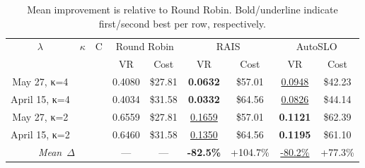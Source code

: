 \documentclass{article}
\begin{document}
\begin{table}[t]
\centering
\footnotesize
\setlength{\tabcolsep}{2.5pt}
\caption{Mean improvement is relative to Round Robin. Bold/underline indicate first/second best per row, respectively.}\label{tab:todo}
\begin{tabular}{c c c || c c | c c | c c}
\toprule
$\lambda$ & $\kappa$ & C & \multicolumn{2}{c|}{Round Robin} & \multicolumn{2}{c|}{RAIS} & \multicolumn{2}{c}{AutoSLO} \\
 &  &  & VR & Cost & VR & Cost & VR & Cost \\
\hline
May 27, κ=4 &  &  & 0.4080 & \$27.81 & \textbf{0.0632} & \$57.01 & \underline{0.0948} & \$42.23 \\
April 15, κ=4 &  &  & 0.4034 & \$31.58 & \textbf{0.0332} & \$64.56 & \underline{0.0826} & \$44.14 \\
May 27, κ=2 &  &  & 0.6559 & \$27.81 & \underline{0.1659} & \$57.01 & \textbf{0.1121} & \$62.39 \\
April 15, κ=2 &  &  & 0.6460 & \$31.58 & \underline{0.1350} & \$64.56 & \textbf{0.1195} & \$61.10 \\
\hline
\multicolumn{3}{c||}{\textit{Mean~$\Delta$}} & --- & --- & \textbf{-82.5\%} & +104.7\% & \underline{-80.2\%} & +77.3\% \\
\bottomrule
\end{tabular}
\end{table}
\end{document}
